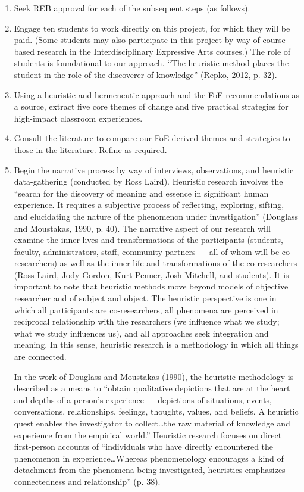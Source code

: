 \documentclass[letterpaper,10pt,headsepline]{scrreprt}
\begin{document}
\begin{enumerate}

\item Seek REB approval for each of the subsequent steps (as follows).

\item Engage ten students to work directly on this project, for which they
  will be paid. (Some students may also participate in this project by way of
  course-based research in the Interdisciplinary Expressive Arts courses.) The
  role of students is foundational to our approach. ``The heuristic method
  places the student in the role of the discoverer of knowledge'' (Repko,
  2012, p. 32).

\item Using a heuristic and hermeneutic approach and the FoE recommendations
  as a source, extract five core themes of change and five practical
  strategies for high-impact classroom experiences.

\item Consult the literature to compare our FoE-derived themes and strategies
  to those in the literature. Refine as required.

\item Begin the narrative process by way of interviews, observations, and
  heuristic data-gathering (conducted by Ross Laird). Heuristic research
  involves the ``search for the discovery of meaning and essence in
  significant human experience. It requires a subjective process of
  reflecting, exploring, sifting, and elucidating the nature of the phenomenon
  under investigation'' (Douglass and Moustakas, 1990, p. 40). The narrative
  aspect of our research will examine the inner lives and transformations of
  the participants (students, faculty, administrators, staff, community
  partners --- all of whom will be co-researchers) as well as the inner life
  and transformations of the co-researchers (Ross Laird, Jody Gordon, Kurt
  Penner, Josh Mitchell, and students). It is important to note that heuristic
  methods move beyond models of objective researcher and of subject and
  object. The heuristic perspective is one in which all participants are
  co-researchers, all phenomena are perceived in reciprocal relationship with
  the researchers (we influence what we study; what we study influences us),
  and all approaches seek integration and meaning. In this sense, heuristic
  research is a methodology in which all things are connected.

  In the work of Douglass and Moustakas (1990), the heuristic methodology is
  described as a means to ``obtain qualitative depictions that are at the heart
  and depths of a person's experience --- depictions of situations, events,
  conversations, relationships, feelings, thoughts, values, and beliefs. A
  heuristic quest enables the investigator to collect\ldots the raw material of
  knowledge and experience from the empirical world.'' Heuristic research
  focuses on direct first-person accounts of ``individuals who have directly
  encountered the phenomenon in experience\ldots Whereas phenomenology encourages
  a kind of detachment from the phenomena being investigated, heuristics
  emphasizes connectedness and relationship'' (p. 38).


\end{enumerate}
\end{document}
